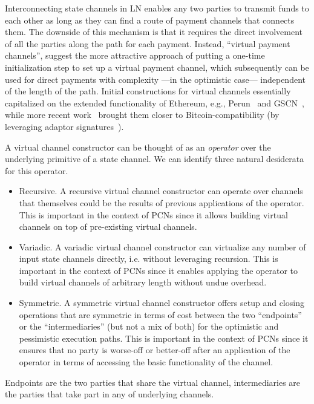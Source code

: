 Interconnecting state channels in LN enables any two parties to transmit funds to each other as long as they can find a route of payment channels that connects them. The downside of this mechanism is that it requires the direct involvement of all the parties along the path for each payment. Instead, ``virtual payment channels'', suggest the more attractive approach of putting a one-time initialization step to set up a virtual payment channel, which subsequently can be used for direct payments with complexity  ---in the optimistic case---  independent of the length of the path.
Initial constructions for virtual channels essentially capitalized on the extended functionality of Ethereum, e.g., 
Perun~\cite{perun} and GSCN~\cite{DBLP:conf/ccs/DziembowskiFH18}, while more
recent work~\cite{cryptoeprint:2020:554}  brought them closer to
Bitcoin-compatibility (by leveraging adaptor
signatures~\cite{cryptoeprint:2020:476}).

A virtual channel constructor can be thought of as an  {\em operator} over the underlying primitive of a state channel. We can identify three   natural desiderata for this operator. 

\begin{itemize}
\item Recursive. A recursive virtual channel constructor can operate over channels that themselves could be the results of previous applications of the operator. This is important in the context of PCNs since it allows building virtual channels on top of pre-existing virtual channels.
\item Variadic. A variadic virtual channel constructor can virtualize any number
of input state channels directly, i.e. without leveraging recursion. This is
important in the context of PCNs since it enables applying the operator to build
virtual channels of arbitrary length without undue overhead.
\item Symmetric. A symmetric virtual channel constructor offers setup and
closing operations that are symmetric in terms of cost between the two
``endpoints'' or the ``intermediaries'' (but not a mix of both) for the optimistic and pessimistic execution paths. This is important in the context of PCNs since it ensures that no party is worse-off or better-off after an application of the operator in terms of accessing the basic functionality of the channel. 
\end{itemize}

Endpoints are the two parties that share the virtual channel, intermediaries are
the parties that take part in any of underlying channels.

